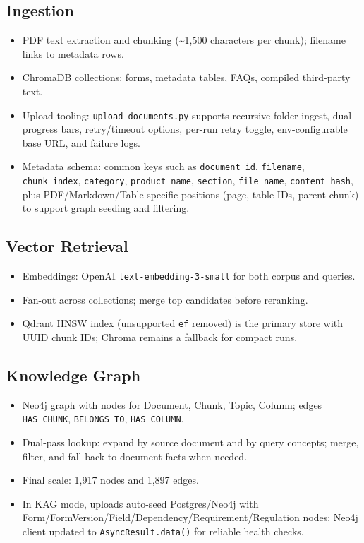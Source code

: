 \documentclass[11pt,a4paper]{article}
\begin{document}
\subsection{Ingestion}
\begin{itemize}[leftmargin=1.2cm]
    \item PDF text extraction and chunking (\textasciitilde1{,}500 characters per chunk); filename links to metadata rows.
    \item ChromaDB collections: forms, metadata tables, FAQs, compiled third-party text.
    \item Upload tooling: \texttt{upload\_documents.py} supports recursive folder ingest, dual progress bars, retry/timeout options, per-run retry toggle, env-configurable base URL, and failure logs.
    \item Metadata schema: common keys such as \texttt{document\_id}, \texttt{filename}, \texttt{chunk\_index}, \texttt{category}, \texttt{product\_name}, \texttt{section}, \texttt{file\_name}, \texttt{content\_hash}, plus PDF/Markdown/Table-specific positions (page, table IDs, parent chunk) to support graph seeding and filtering.
\end{itemize}

\subsection{Vector Retrieval}
\begin{itemize}[leftmargin=1.2cm]
    \item Embeddings: OpenAI \texttt{text-embedding-3-small} for both corpus and queries.
    \item Fan-out across collections; merge top candidates before reranking.
    \item Qdrant HNSW index (unsupported \texttt{ef} removed) is the primary store with UUID chunk IDs; Chroma remains a fallback for compact runs.
\end{itemize}

\subsection{Knowledge Graph}
\begin{itemize}[leftmargin=1.2cm]
    \item Neo4j graph with nodes for Document, Chunk, Topic, Column; edges \texttt{HAS\_CHUNK}, \texttt{BELONGS\_TO}, \texttt{HAS\_COLUMN}.
    \item Dual-pass lookup: expand by source document and by query concepts; merge, filter, and fall back to document facts when needed.
    \item Final scale: 1,917 nodes and 1,897 edges.
    \item In KAG mode, uploads auto-seed Postgres/Neo4j with Form/FormVersion/Field/Dependency/Requirement/Regulation nodes; Neo4j client updated to \texttt{AsyncResult.data()} for reliable health checks.
\end{itemize}
\end{document}
